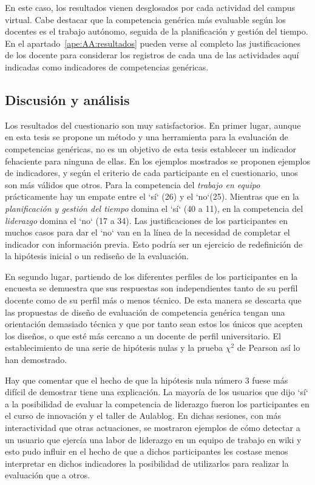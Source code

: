En este caso, los resultados vienen desglosados por cada actividad del campus virtual. Cabe destacar que la competencia genérica más evaluable según los docentes es el trabajo autónomo, seguida de la planificación y gestión del tiempo. En el apartado~\ref{ape:AA:resultados} pueden verse al completo las justificaciones de los docente para considerar los registros de cada una de las actividades aquí indicadas como indicadores de competencias genéricas.

\subsection{Discusión y análisis}

Los resultados del cuestionario son muy satisfactorios. En primer lugar, aunque en esta tesis se propone un método y una herramienta para la evaluación de competencias genéricas, no es un objetivo de esta tesis establecer un indicador fehaciente para ninguna de ellas. En los ejemplos mostrados se proponen ejemplos de indicadores, y según el criterio de cada participante en el cuestionario, unos son más válidos que otros. Para la competencia del \emph{trabajo en equipo} prácticamente hay un empate entre el `sí` (26) y el `no`(25). Mientras que en la \emph{planificación y gestión del tiempo} domina el `sí` (40 a 11), en la competencia del \emph{liderazgo} domina el `no` (17 a 34). Las justificaciones de los participantes en muchos casos para dar el `no` van en la línea de la necesidad de completar el indicador con información previa. Esto podría ser un ejercicio de redefinición de la hipótesis inicial o un rediseño de la evaluación.

En segundo lugar, partiendo de los diferentes perfiles de los participantes en la encuesta se demuestra que sus respuestas son independientes tanto de su perfil docente como de su perfil más o menos técnico. De esta manera se descarta que las propuestas de diseño de evaluación de competencia genérica tengan una orientación demasiado técnica y que por tanto sean estos los únicos que acepten los diseños, o que esté más cercano a un docente de perfil universitario. El establecimiento de una serie de hipótesis nulas y la prueba $\chi^2$ de Pearson así lo han demostrado.

Hay que comentar que el hecho de que la hipótesis nula número 3 fuese más difícil de demostrar tiene una explicación. La mayoría de los usuarios que dijo `sí` a la posibilidad de evaluar la competencia de liderazgo fueron los participantes en el curso de innovación y el taller de Aulablog. En dichas sesiones, con más interactividad que otras actuaciones, se mostraron ejemplos de cómo detectar a un usuario que ejercía una labor de liderazgo en un equipo de trabajo en wiki y esto pudo influir en el hecho de que a dichos participantes les costase menos interpretar en dichos indicadores la posibilidad de utilizarlos para realizar la evaluación que a otros. %

